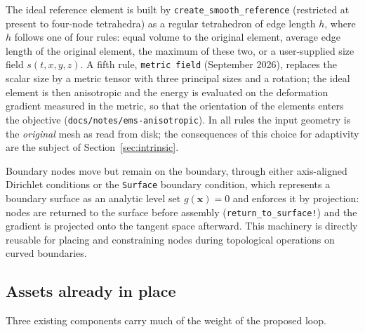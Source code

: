 \documentclass[11pt]{article}
\newcommand{\code}[1]{\texttt{#1}}
\newcommand{\bs}[1]{\boldsymbol{#1}}
\begin{document}
The ideal reference element is built by \code{create\_smooth\_reference}
(restricted at present to four-node tetrahedra) as a regular tetrahedron
of edge length $h$, where $h$ follows one of four rules: equal volume to
the original element, average edge length of the original element, the
maximum of these two, or a user-supplied size field $s(t,x,y,z)$. A fifth
rule, \code{metric field} (September 2026), replaces the scalar size by a
metric tensor with three principal sizes and a rotation; the ideal
element is then anisotropic and the energy is evaluated on the
deformation gradient measured in the metric, so that the orientation of
the elements enters the objective (\code{docs/notes/ems-anisotropic}).
In all rules the input geometry is the \emph{original} mesh as read from
disk; the consequences of this choice for adaptivity are the subject of
Section~\ref{sec:intrinsic}.

Boundary nodes move but remain on the boundary, through either
axis-aligned Dirichlet conditions or the \code{Surface} boundary
condition, which represents a boundary surface as an analytic level set
$g(\bs{x})=0$ and enforces it by projection: nodes are returned to the
surface before assembly (\code{return\_to\_surface!}) and the gradient is
projected onto the tangent space afterward. This machinery is directly
reusable for placing and constraining nodes during topological
operations on curved boundaries.

\subsection{Assets already in place}

Three existing components carry much of the weight of the proposed loop.
\end{document}
